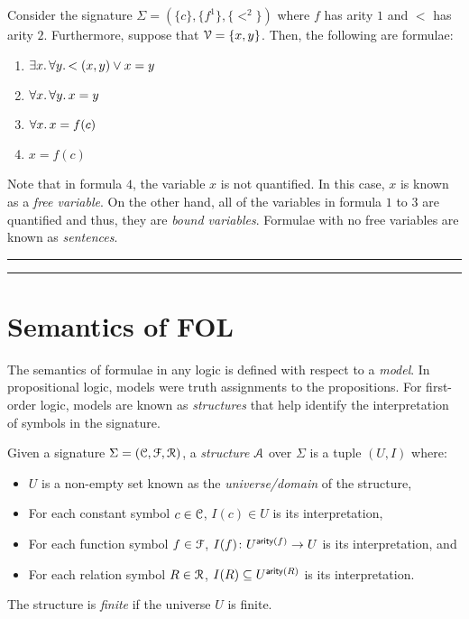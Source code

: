 \documentclass[11pt,usenames, dvipsnames]{article}
\DeclareRobustCommand{\euscr}[1]{%
  \text{\usefont{U}{eus}{m}{n}#1}%
}
\begin{document}
\begin{example}
  Consider the signature $\Sigma = (\{c\}, \{f^1\}, \{<^2\})$ where $f$ has arity $1$ and $<$ has arity $2$. Furthermore, suppose that $\vars = \{x, y\}$. Then, the following are formulae:
  \begin{enumerate}
    \item $\exists x \ldotp \forall y \ldotp <(x, y) \vee x = y$
    \item $\forall x \ldotp \forall y \ldotp x = y$
    \item $\forall x \ldotp x = f(c)$
    \item $x = f(c)$
  \end{enumerate}
\end{example}

Note that in formula $4$, the variable $x$ is not quantified. In this case, $x$ is known as a \emph{free variable}. On the other hand, all of the variables in formula $1$ to $3$ are quantified and thus, they are \emph{bound variables}. Formulae with no free variables are known as \emph{sentences}.

\vspace{5truemm}
\hrule
\hrule

\section*{\large \centering Semantics of FOL}
\noindent

The semantics of formulae in any logic is defined with respect to a \emph{model}. In propositional logic, models were truth assignments to the propositions. For first-order logic, models are known as \emph{structures} that help identify the interpretation of symbols in the signature.

\begin{definition}[Structure]
  Given a signature $\Sigma = (\conn, \func, \reln)$, a \emph{structure} $\euscr{A}$ over $\Sigma$ is a tuple $(U, I)$ where:
  \begin{itemize}
    \item $U$ is a non-empty set known as the \emph{universe/domain} of the structure,
    \item For each constant symbol $c \in \conn$, $I(c) \in U$ is its interpretation,
    \item For each function symbol $f \in \func$, $I(f) \colon U^{\mathsf{arity}(f)} \rightarrow U$ is its interpretation, and
    \item For each relation symbol $R \in \reln$, $I(R) \subseteq U^{\mathsf{arity}(R)}$ is its interpretation.
  \end{itemize}

  The structure is \emph{finite} if the universe $U$ is finite.
\end{definition}
\end{document}
